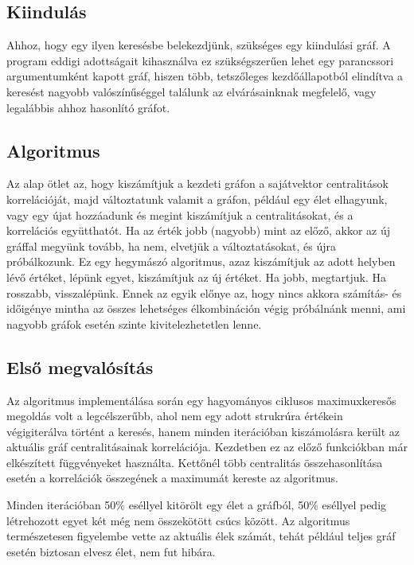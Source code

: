 \documentclass[12pt,numbers=noenddot]{report}
\begin{document}
\subsection{Kiindulás}
Ahhoz, hogy egy ilyen keresésbe belekezdjünk, szükséges egy kiindulási gráf.
A program eddigi adottságait kihasználva ez szükségszerűen lehet egy parancssori
argumentumként kapott gráf, hiszen több, tetszőleges kezdőállapotból elindítva a 
keresést nagyobb valószínűséggel találunk az elvárásainknak megfelelő, vagy 
legalábbis ahhoz hasonlító gráfot.

\subsection{Algoritmus}
Az alap ötlet az, hogy kiszámítjuk a kezdeti gráfon a sajátvektor centralitások
korrelációját, majd változtatunk valamit a gráfon, például egy élet elhagyunk,
vagy egy újat hozzáadunk és megint kiszámítjuk a centralitásokat, és a 
korrelációs együtthatót. Ha az érték jobb (nagyobb) mint az előző, akkor 
az új gráffal megyünk tovább, ha nem, elvetjük a változtatásokat, és újra 
próbálkozunk. 
Ez egy hegymászó algoritmus, azaz kiszámítjuk az adott helyben lévő értéket,
lépünk egyet, kiszámítjuk az új értéket. Ha jobb, megtartjuk. Ha rosszabb,
visszalépünk. Ennek az egyik előnye az, hogy nincs akkora számítás- és időigénye
mintha az összes lehetséges élkombináción végig próbálnánk menni, ami nagyobb 
gráfok esetén szinte kivitelezhetetlen lenne.

\pagebreak

\subsection{Első megvalósítás}
Az algoritmus implementálása során egy hagyományos ciklusos maximuxkeresős 
megoldás volt a legcélszerűbb, ahol nem egy adott strukrúra értékein
végigiterálva történt a keresés, hanem minden iterációban kiszámolásra került
az aktuális gráf centralitásainak korrelációja. Kezdetben ez az előző 
funkciókban már elkészített függvényeket használta. Kettőnél több centralitás
összehasonlítása esetén a korrelációk összegének a maximumát kereste az 
algoritmus.

Minden iterációban 50\% eséllyel kitörölt egy élet a gráfból, 50\% eséllyel 
pedig létrehozott egyet két még nem összekötött csúcs között. Az algoritmus 
természetesen figyelembe vette az aktuális élek számát, tehát például teljes 
gráf esetén biztosan elvesz élet, nem fut hibára.
\end{document}

